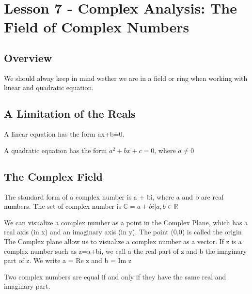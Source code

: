 \documentclass{article}
\begin{document}
\section{Lesson 7 - Complex Analysis: The Field of Complex Numbers}
\subsection{Overview}

We should alway keep in mind wether we are in a field or ring when working with
linear and quadratic equation.

\subsection{A Limitation of the Reals}

\begin{definition}
    A linear equation has the form ax+b=0.
\end{definition}

\begin{definition}
    A quadratic equation has the form $a^2 + bx + c =0 $, where $a \neq 0$
\end{definition}

\subsection{The Complex Field}

\begin{definition}
    The standard form of a complex number is a + bi, where a and b are real numbers.
    The set of complex number is $\mathbb{C} = {a + bi | a,b \in \mathbb{R}}$
\end{definition}

\begin{definition}
    We can visualize a complex number as a point in the Complex Plane, which has
    a real axis (in x) and an imaginary axis (in y). The point (0,0) is called
    the origin\\

    The Complex plane allow us to visualize a complex number as a vector. If
    z is a complex number such as z=a+bi, we call a the real part of z and b the
    imaginary part of z. We write a = Re z and b = Im z
\end{definition}

\begin{definition}[Equality]
    Two complex numbers are equal if and only if they have the same real and
    imaginary part.
\end{definition}
\end{document}
